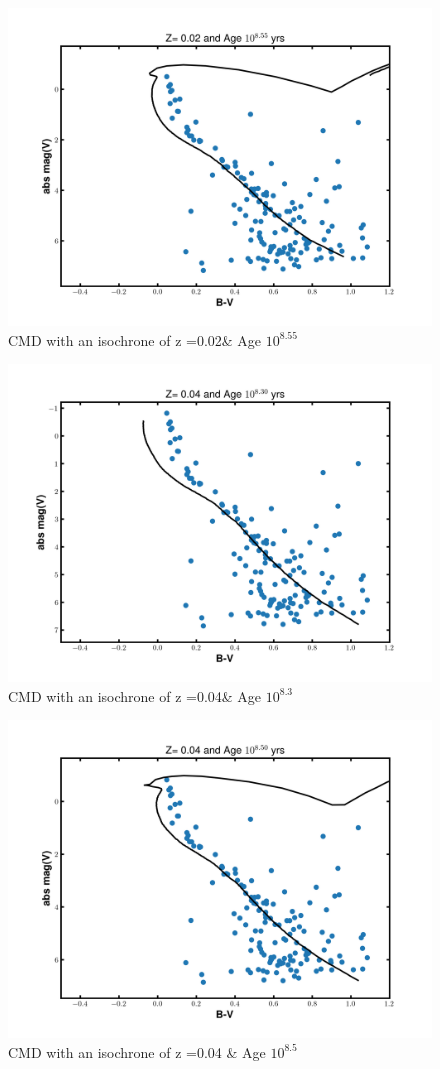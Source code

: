 \documentclass[12pt]{article}
\begin{document}
    \begin{figure}[H]
    \centering
    \includegraphics[width=\textwidth]{fig/iso_z020_855.png}
    \caption{CMD with an isochrone of z =0.02\& Age $10^{8.55}$}
    \end{figure}

    \begin{figure}[H]
    \centering
    \includegraphics[width=\textwidth]{fig/iso_z040_830.png}
    \caption{CMD with an isochrone of z =0.04\& Age $10^{8.3}$}
    \end{figure}
    
    \begin{figure}[H]
    \centering
    \includegraphics[width=\textwidth]{fig/iso_z040_850.png}
    \caption{CMD with an isochrone of z =0.04 \& Age $10^{8.5}$}
    \end{figure}
            
\end{document}
